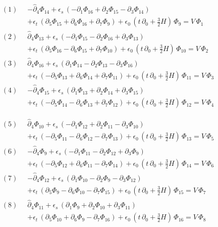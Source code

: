 \documentclass[11pt]{article}
\begin{document}
\[
\begin{aligned}
(1)\;\; & -\hat\partial_4\Phi_{14} + \epsilon_s\,(-\partial_1\Phi_{16} + \partial_2\Phi_{15} - \partial_3\Phi_{14}) \\
& + \epsilon_t\,(\partial_5\Phi_{15} + \partial_6\Phi_{16} + \partial_7\Phi_{9}) + \epsilon_0\,(t\,\partial_0 + \tfrac32H)\,\Phi_{9} = V\,\Phi_{1} \\
(2)\;\; & \hat\partial_4\Phi_{13} + \epsilon_s\,(-\partial_1\Phi_{15} - \partial_2\Phi_{16} + \partial_3\Phi_{13}) \\
& + \epsilon_t\,(\partial_5\Phi_{16} - \partial_6\Phi_{15} + \partial_7\Phi_{10}) + \epsilon_0\,(t\,\partial_0 + \tfrac32H)\,\Phi_{10} = V\,\Phi_{2} \\
(3)\;\; & \hat\partial_4\Phi_{16} + \epsilon_s\,(\partial_1\Phi_{14} - \partial_2\Phi_{13} - \partial_3\Phi_{16}) \\
& + \epsilon_t\,(-\partial_5\Phi_{13} + \partial_6\Phi_{14} + \partial_7\Phi_{11}) + \epsilon_0\,(t\,\partial_0 + \tfrac32H)\,\Phi_{11} = V\,\Phi_{3} \\
(4)\;\; & -\hat\partial_4\Phi_{15} + \epsilon_s\,(\partial_1\Phi_{13} + \partial_2\Phi_{14} + \partial_3\Phi_{15}) \\
& + \epsilon_t\,(-\partial_5\Phi_{14} - \partial_6\Phi_{13} + \partial_7\Phi_{12}) + \epsilon_0\,(t\,\partial_0 + \tfrac32H)\,\Phi_{12} = V\,\Phi_{4}
\end{aligned}
\]

\[
\begin{aligned}
(5)\;\; & \hat\partial_4\Phi_{10} + \epsilon_s\,(-\partial_1\Phi_{12} + \partial_2\Phi_{11} - \partial_3\Phi_{10}) \\
& + \epsilon_t\,(-\partial_5\Phi_{11} - \partial_6\Phi_{12} - \partial_7\Phi_{13}) + \epsilon_0\,(t\,\partial_0 + \tfrac32H)\,\Phi_{13} = V\,\Phi_{5} \\
(6)\;\; & -\hat\partial_4\Phi_{9} + \epsilon_s\,(-\partial_1\Phi_{11} - \partial_2\Phi_{12} + \partial_3\Phi_{9}) \\
& + \epsilon_t\,(-\partial_5\Phi_{12} + \partial_6\Phi_{11} - \partial_7\Phi_{14}) + \epsilon_0\,(t\,\partial_0 + \tfrac32H)\,\Phi_{14} = V\,\Phi_{6} \\
(7)\;\; & -\hat\partial_4\Phi_{12} + \epsilon_s\,(\partial_1\Phi_{10} - \partial_2\Phi_{9} - \partial_3\Phi_{12}) \\
& + \epsilon_t\,(\partial_5\Phi_{9} - \partial_6\Phi_{10} - \partial_7\Phi_{15}) + \epsilon_0\,(t\,\partial_0 + \tfrac32H)\,\Phi_{15} = V\,\Phi_{7} \\
(8)\;\; & \hat\partial_4\Phi_{11} + \epsilon_s\,(\partial_1\Phi_{9} + \partial_2\Phi_{10} + \partial_3\Phi_{11}) \\
& + \epsilon_t\,(\partial_5\Phi_{10} + \partial_6\Phi_{9} - \partial_7\Phi_{16}) + \epsilon_0\,(t\,\partial_0 + \tfrac32H)\,\Phi_{16} = V\,\Phi_{8}
\end{aligned}
\]
\end{document}
